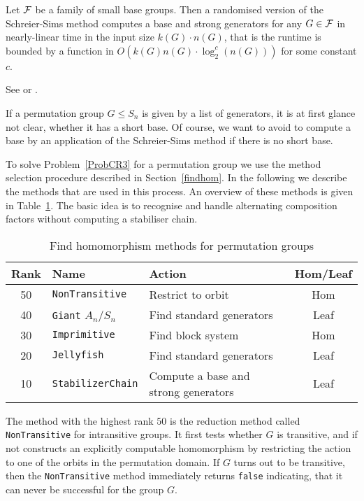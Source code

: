 \begin{Theo}
Let $\mathcal{F}$ be a family of small base groups. Then a randomised version
of the Schreier-Sims method computes a base and strong generators
for any $G \in \mathcal{F}$ in nearly-linear time in the input size $k(G)\cdot
n(G)$, that is the runtime is bounded by a function in
$O(k(G)n(G) \cdot \log^c_2(n(G)))$ for some constant $c$.
\end{Theo}
\proofbeg See \cite{nearlylin} or \cite[Theorem 4.5.5]{Ser}. \proofend

\medskip
If a permutation group $G \le S_n$ is given by a list of generators, it
is at first glance not clear, whether it has a short base. Of course,
we want to avoid to compute a base by an application of the Schreier-Sims
method if there is no short base.

To solve Problem~\ref{ProbCR3} for a permutation group we use the method
selection procedure described in Section~\ref{findhom}. In the following we
describe the methods that are used in this process. An overview of these 
methods is given in Table~\ref{permdb}. The basic idea is to recognise
and handle alternating composition factors without computing a stabiliser 
chain.

\begin{table}[ht]
\begin{center}
\begin{tabular}{|c|l|l|c|}
\hline
Rank & Name & Action & Hom/Leaf \\
\hline
\hline
50 & \texttt{NonTransitive} & Restrict to orbit & Hom \\
\hline
40 & \texttt{Giant} $A_n/S_n$ & Find standard generators & Leaf \\
\hline
30 & \texttt{Imprimitive} & Find block system & Hom \\
\hline
20 & \texttt{Jellyfish} & Find standard generators & Leaf \\
\hline
10 & \texttt{StabilizerChain} & Compute a base and strong generators & Leaf \\
\hline
\end{tabular}
\end{center}
\caption{Find homomorphism methods for permutation groups}
\label{permdb}
\end{table}

The method with the highest rank $50$ is the reduction method called
\texttt{NonTransitive} for intransitive groups. It first tests whether
$G$ is transitive, and if not constructs an explicitly
computable homomorphism by restricting the action to one of the orbits in the
permutation domain. If $G$ turns out to be transitive, then the
\texttt{NonTransitive} method immediately returns \texttt{false}
indicating, that it can never be successful for the group $G$.

